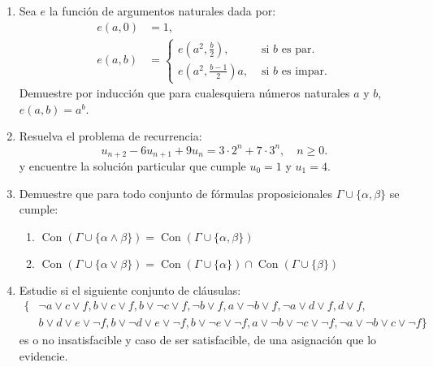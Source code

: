 \documentclass[10pt,spanish]{article}
\begin{document}
\begin{flushleft}
  \begin{enumerate}
  \item Sea $e$ la función de argumentos naturales dada por:
    \begin{align*}
      e(a,0)&=1,\\
      e(a,b)&=
              \begin{cases}
                e\left(a^{2},\frac{b}{2}\right),&\text{ si $b$ es par.}\\
                e\left(a^{2},\frac{b-1}{2}\right)a,&\text{ si $b$ es impar.}
              \end{cases}
    \end{align*}
    Demuestre por inducción que para cualesquiera números naturales
    $a$ y $b$, $e(a,b)=a^{b}$.
    
  \item Resuelva el problema de recurrencia:
    \begin{equation*}
      u_{n+2}-6u_{n+1}+9u_{n}=3\cdot 2^{n}+7\cdot 3^{n}, \quad n\geq 0.
    \end{equation*}
    y encuentre la solución particular que cumple $u_{0}=1$ y $u_{1}=4$.

\item Demuestre que para todo conjunto de fórmulas proposicionales
  $\Gamma\cup\{\alpha,\beta\}$ se cumple:
  \begin{enumerate}
  \item $\operatorname{Con}(\Gamma\cup\{\alpha\wedge\beta\})=
    \operatorname{Con}(\Gamma\cup\{\alpha,\beta\})$
  \item $\operatorname{Con}(\Gamma\cup\{\alpha\vee\beta\})=
    \operatorname{Con}(\Gamma\cup\{\alpha\})\cap \operatorname{Con}(\Gamma\cup\{\beta\})$
  \end{enumerate}

\item Estudie si el siguiente conjunto de cláusulas:
  \begin{align*}
    \{&\neg a\vee c\vee f, b\vee c\vee f, b\vee\neg c\vee f,
       \neg b\vee f, a\vee\neg b\vee f, \neg a\vee d\vee f, d\vee f,\\ 
      &b\vee d\vee e\vee\neg f, b\vee\neg d\vee e\vee\neg f, b\vee\neg e\vee\neg f,
      a\vee\neg b\vee\neg c\vee\neg f, \neg a\vee\neg b\vee c\vee\neg f\}
  \end{align*}
  es o no insatisfacible y caso de ser satisfacible, de una asignación
  que lo evidencie.


\end{enumerate}
\end{flushleft}
\end{document}

